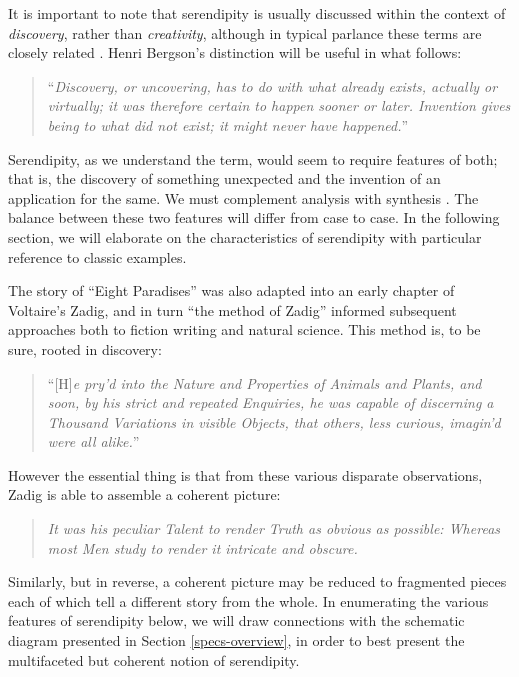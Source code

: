 It is important to note that serendipity is usually discussed within
the context of \emph{discovery}, rather than \emph{creativity},
although in typical parlance these terms are closely related
\cite{jordanous12jims}.  Henri Bergson's distinction will be useful in
what follows:
\begin{quote}
``\emph{Discovery, or uncovering, has to do with what already exists,
    actually or virtually; it was therefore certain to happen sooner
    or later.  Invention gives being to what did not exist; it might
    never have happened.}''~\cite{bergson2010creative}
\end{quote}
Serendipity, as we understand the term, would seem to require features
of both; that is, the discovery of something unexpected and the
invention of an application for the same.  We must complement analysis
with synthesis \cite{delanda1993virtual}.  The balance between these
two features will differ from case to case.  In the following section,
we will elaborate on the characteristics of serendipity with
particular reference to classic examples.


The story of ``Eight Paradises'' was also adapted into an early
chapter of Voltaire's Zadig, and in turn ``the method of Zadig''
informed subsequent approaches both to fiction writing and natural
science.  This method is, to be sure, rooted in discovery:

\begin{quote}
``[H]\emph{e pry’d into the Nature and Properties of Animals and
    Plants, and soon, by his strict and repeated Enquiries, he was
    capable of discerning a Thousand Variations in visible Objects,
    that others, less curious, imagin’d were all
    alike.}''~\cite[pp. 21--22]{zadig}
\end{quote}

\noindent However the essential thing is that from these various
disparate observations, Zadig is able to assemble a coherent picture:

\begin{quote}
\emph{It was his peculiar Talent to render Truth as obvious as
  possible: Whereas most Men study to render it intricate and
  obscure.}~\cite[p. 54]{zadig}
\end{quote}
Similarly, but in reverse, a coherent picture may be reduced to
fragmented pieces each of which tell a different story from the whole.
In enumerating the various features of serendipity below, we will draw
connections with the schematic diagram presented in Section
\ref{specs-overview}, in order to best present the multifaceted but
coherent notion of serendipity.

